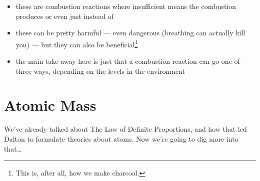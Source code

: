 \documentclass[11pt, oneside]{article}   	%
\newtheorem{definition}{Definition}
\begin{document}
\begin{itemize}
\item these are combustion reactions where insufficient  means the combustion produces  or even just  instead of 
\item these can be pretty harmful --- even dangerous (breathing  can actually kill you) --- but they can also be beneficial\footnote{This is, after all, how we make charcoal.}
\item the main take-away here is just that a combustion reaction can go one of three ways, depending on the  levels in the environment
\end{itemize}


\section{Atomic Mass}

We've already talked about The Law of Definite Proportions, and how that led Dalton to formulate theories about atoms. Now we're going to dig more into that\ldots
\end{document}
